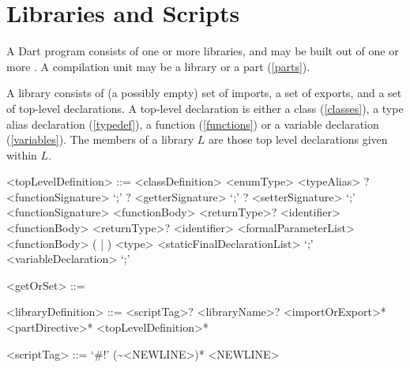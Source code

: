 \documentclass[makeidx]{article}
\begin{document}
{%





\section{Libraries and Scripts}

\LMHash{}%
A Dart program consists of one or more libraries, and may be built out of one or more .
A compilation unit may be a library or a part (\ref{parts}).

\LMHash{}%
A library consists of (a possibly empty) set of imports, a set of exports, and a set of top-level declarations.
A top-level declaration is either a class (\ref{classes}), a type alias declaration (\ref{typedef}), a function (\ref{functions}) or a variable declaration (\ref{variables}).
The members of a library $L$ are those top level declarations given within $L$.

\begin{grammar}
<topLevelDefinition> ::= <classDefinition>
  \alt <enumType>
  \alt <typeAlias>
  \alt \EXTERNAL{}? <functionSignature> `;'
  \alt \EXTERNAL{}? <getterSignature> `;'
  \alt \EXTERNAL{}? <setterSignature> `;'
  \alt <functionSignature> <functionBody>
  \alt <returnType>? \GET{} <identifier> <functionBody>
  \alt <returnType>? \SET{} <identifier> <formalParameterList> <functionBody>
  \alt (\FINAL{} | \CONST{}) <type> <staticFinalDeclarationList> `;'
  \alt <variableDeclaration> `;'

<getOrSet> ::= \GET{}
  \alt \SET{}

<libraryDefinition> ::= \gnewline{}
  <scriptTag>? <libraryName>? <importOrExport>* <partDirective>*
  \gnewline{} <topLevelDefinition>*

<scriptTag> ::= `#!' (\~{}<NEWLINE>)* <NEWLINE>


\end{grammar}}
\end{document}
